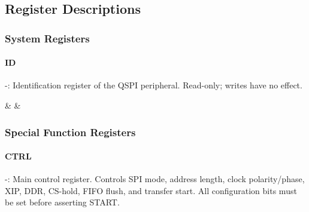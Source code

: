 \subsection{Register Descriptions}

\subsubsection{System Registers}

\paragraph{ID} -:
Identification register of the QSPI peripheral. Read-only; writes have no effect.

                             {}
                             {}
                             {}
                             {}
                             {}
                             {&}
                             {&}

\subsubsection{Special Function Registers}

\paragraph{CTRL} -:
Main control register. Controls SPI mode, address length, clock polarity/phase,
XIP, DDR, CS-hold, FIFO flush, and transfer start.
All configuration bits must be set before asserting START.

